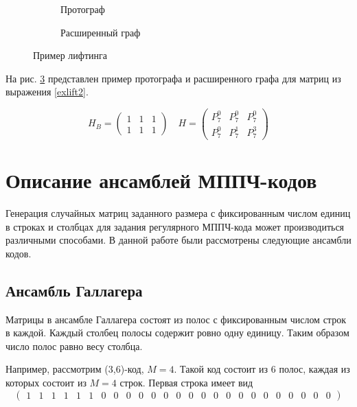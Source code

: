 \begin{figure}[h!]
\centering
\begin{subfigure}{0.2\textwidth}
  \centering
  \caption{Протограф}
  \label{liftingBase}
\end{subfigure}%
\begin{subfigure}{.8\textwidth}
  \centering
  \caption{Расширенный граф}
  \label{liftingExpanded}
\end{subfigure}
\caption{Пример лифтинга}
\label{exliftgraph}
\end{figure}

На рис. \ref{exliftgraph} представлен пример протографа и расширенного графа для матриц из выражения \ref{exlift2}.

\begin{equation} \label{exlift2}
	H_B=\begin{pmatrix}
		1 & 1 & 1 \\
		1 & 1 & 1
	\end{pmatrix}
	\quad
	H=\begin{pmatrix}
		P^0_7 & P^0_7 & P^0_7 \\
		P^0_7 & P^1_7 & P^3_7
	\end{pmatrix}
\end{equation}

\section{Описание ансамблей МППЧ-кодов}

Генерация случайных матриц заданного размера с фиксированным числом единиц в строках и столбцах для
задания регулярного МППЧ-кода может производиться различными способами. В данной работе были рассмотрены следующие ансамбли кодов.

\subsection{Ансамбль Галлагера}

Матрицы в ансамбле Галлагера состоят из полос с фиксированным числом строк в каждой. Каждый столбец
полосы содержит ровно одну единицу. Таким образом число полос равно весу столбца.

Например, рассмотрим (3,6)-код, $M=4$. Такой код состоит из 6 полос, каждая из которых состоит
из $M=4$ строк. Первая строка имеет вид
\setcounter{MaxMatrixCols}{30}
\[
\begin{pmatrix}
1 & 1 & 1 & 1 & 1 & 1 & 0 & 0 & 0 & 0 & 0 & 0 & 0 & 0 & 0 & 0 & 0 & 0 & 0 & 0 & 0 & 0 & 0 & 0 & 0
\end{pmatrix}
\]

